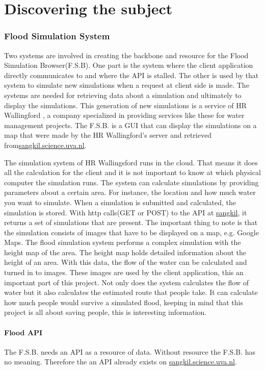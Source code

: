\part{Discovering the subject}
\label{part:Discovering}
\section{Flood Simulation System}
Two systems are involved in creating the backbone and resource for the Flood Simulation Browser(F.S.B). One part is the system where the client application directly communicates to and where the API is stalled. The other is used by that system to simulate new simulations when a request at client side is made. The systems are needed for retrieving data about a simulation and ultimately to display the simulations. This generation of new simulations is a service of HR Wallingford \cite{wallingford}, a company specialized in providing services like these for water management projects. The F.S.B. is a GUI\cite{GUI} that can display the simulations on a map that were made by the HR Wallingford's server and retrieved from\url{sangkil.science.uva.nl}.

The simulation system of HR Wallingsford runs in the cloud. That means it does all the calculation for the client and it is not important to know at which physical computer the simulation runs. The system can calculate simulations by providing parameters about a certain area. For instance, the location and how much water you want to simulate. When a simulation is submitted and calculated, the simulation is stored. With http calls(GET or POST) to the API at \url{sangkil}, it returns a set of simulations that are present. The important thing to note is that the simulation consists of images that have to be displayed on a map, e.g. Google Maps. The flood simulation system performs a complex simulation with the height map of the area. The height map holds detailed information about the height of an area. With this data, the flow of the water can be calculated and turned in to images. These images are used by the client application, this an important part of this project.
Not only does the system calculates the flow of water but it also calculates the estimated route that people take. It can calculate how much people would survive a simulated flood, keeping in mind that this project is all about saving people, this is interesting information.
 
\subsection{Flood API}
The F.S.B. needs an API as a resource of data. Without resource the F.S.B. has no meaning. Therefore the an API already exists on \url{sangkil.science.uva.nl}.

